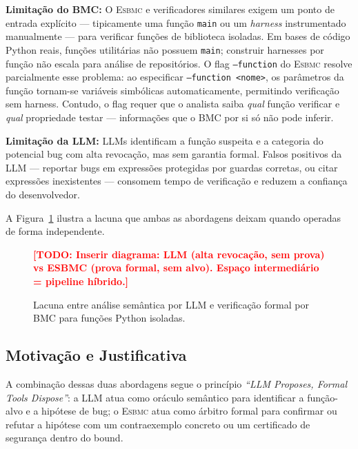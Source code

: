 \documentclass[conference]{IEEEtran}
\newcommand{\esbmc}{\textsc{Esbmc}}
\newcommand{\todo}[1]{\textcolor{red}{\textbf{[TODO: #1]}}}
\begin{document}
\textbf{Limitação do BMC:} O \esbmc{} e verificadores similares exigem
um ponto de entrada explícito — tipicamente uma função \texttt{main} ou
um \textit{harness} instrumentado manualmente — para verificar funções
de biblioteca isoladas.
Em bases de código Python reais, funções utilitárias não possuem
\texttt{main}; construir harnesses por função não escala para análise
de repositórios.
O flag \texttt{--function} do \esbmc{} resolve parcialmente esse problema:
ao especificar \texttt{--function~<nome>}, os parâmetros da função tornam-se
variáveis simbólicas automaticamente, permitindo verificação sem harness.
Contudo, o flag requer que o analista saiba \emph{qual} função verificar
e \emph{qual} propriedade testar — informações que o BMC por si só
não pode inferir.

\textbf{Limitação da LLM:} LLMs identificam a função suspeita e a
categoria do potencial bug com alta revocação, mas sem garantia formal.
Falsos positivos da LLM — reportar bugs em expressões protegidas por
guardas corretas, ou citar expressões inexistentes — consomem tempo de
verificação e reduzem a confiança do desenvolvedor.

A Figura~\ref{fig:gap} ilustra a lacuna que ambas as abordagens deixam
quando operadas de forma independente.

\begin{figure}[ht]
  \centering
  \todo{Inserir diagrama: LLM (alta revocação, sem prova) vs ESBMC
        (prova formal, sem alvo). Espaço intermediário = pipeline híbrido.}
  \caption{Lacuna entre análise semântica por LLM e verificação formal
           por BMC para funções Python isoladas.}
  \label{fig:gap}
\end{figure}

\subsection{Motivação e Justificativa}
\label{sec:motivacao}

A combinação dessas duas abordagens segue o princípio
\emph{``LLM Proposes, Formal Tools Dispose''}:
a LLM atua como oráculo semântico para identificar a função-alvo e
a hipótese de bug; o \esbmc{} atua como árbitro formal para confirmar
ou refutar a hipótese com um contraexemplo concreto ou um certificado
de segurança dentro do bound.
\end{document}
